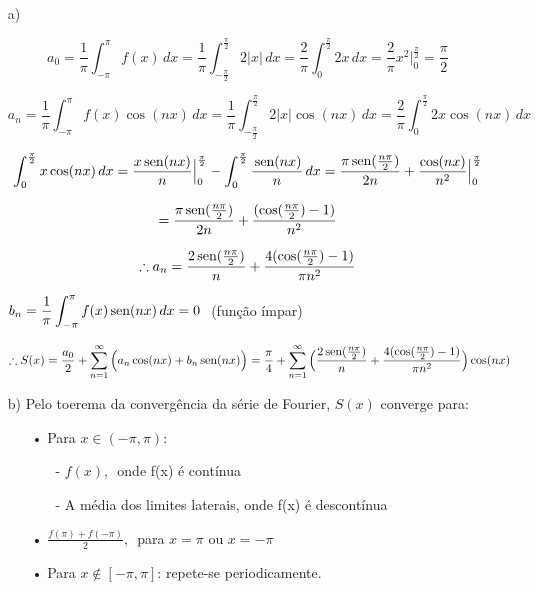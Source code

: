 \documentclass[12pt,a4paper]{article}
\newcommand{\sen}{\mbox{\,sen}}
\begin{document}
\begin{itemize}
\item[a)]

$$ a_0 = \frac{1}{\pi} \int_{-\pi}^\pi f(x) \, dx = \frac{1}{\pi} \int_{-\frac{\pi}{2}}^{\frac{\pi}{2}} 2 |x| \, dx = \frac{2}{\pi} \int_{0}^{\frac{\pi}{2}} 2 x \, dx = \frac{2}{\pi} x^2 \Big|_0^{\frac{\pi}{2}} = \frac{\pi}{2} $$

$$ a_n = \frac{1}{\pi} \int_{-\pi}^\pi f(x) \cos (n x) \, dx = \frac{1}{\pi} \int_{-\frac{\pi}{2}}^{\frac{\pi}{2}} 2 |x| \cos (n x) \, dx = \frac{2}{\pi} \int_{0}^{\frac{\pi}{2}} 2 x \cos (n x) \, dx $$

$$ \int_{0}^{\frac{\pi}{2}}  x \cos (n x) \, dx =  \frac{x \sen (nx)}{n} \Big|_0^\frac{\pi}{2} -  \int_{0}^{\frac{\pi}{2}} \frac{\sen(nx)}{n} \,dx = \frac{\pi \sen( \frac{n \pi}{2})}{2 n} + \frac{\cos (nx)}{n^2} \Big|_0^\frac{\pi}{2}    $$

$$ = \frac{\pi \sen( \frac{n \pi}{2})}{2 n} + \frac{ ( \cos (\frac{n \pi}{2}) -1)}{n^2} $$

$$ \therefore a_n =  \frac{ 2 \sen( \frac{n \pi}{2})}{ n} +  \frac{ 4 ( \cos (\frac{n \pi}{2}) -1)}{\pi n^2} $$

\begin{center}
$b_n = \displaystyle\frac{1}{\pi} \displaystyle\int_{-\pi}^\pi f(x) \sen (n x) \, dx = 0 \,\,$ (função ímpar)
\end{center}

$$ \therefore S(x) = \frac{a_0}{2} + \sum_{n=1}^\infty \Big( a_n \cos(nx) + b_n \sen(nx) \Big) = \frac{\pi}{4} + \sum_{n=1}^\infty \Big( \frac{ 2 \sen( \frac{n \pi}{2})}{ n} +  \frac{ 4 ( \cos (\frac{n \pi}{2}) -1)}{\pi n^2} \Big) \cos (nx) $$

\item[b)] Pelo toerema da convergência da série de Fourier, $S(x)$ converge para:

\begin{itemize}
\item[•] Para $x \in  (-\pi,\pi)$:
	\begin{itemize}
	\item[-] $f(x), \,$ onde f(x) é contínua
	\item[-] A média dos limites laterais, onde f(x) é descontínua
	\end{itemize}
\item[•] $\displaystyle\frac{f(\pi)+f(-\pi)}{2}, \, $ para $ x = \pi $ ou $ x = -\pi $ 
\item[•] Para $x \notin [ -\pi,\pi]$: repete-se periodicamente.
\end{itemize}


\end{itemize}
\end{document}

